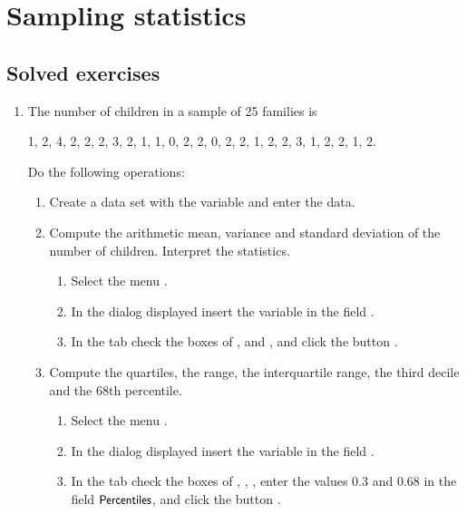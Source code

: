
\chapter{Sampling statistics}\label{cha:statistics}

\section{Solved exercises}
\begin{enumerate}[leftmargin=*]
\item The number of children in a sample of 25 families is
\begin{center}
1, 2, 4, 2, 2, 2, 3, 2, 1, 1, 0, 2, 2, 0, 2, 2, 1, 2, 2, 3, 1, 2, 2, 1, 2.
\end{center}
Do the following operations:
\begin{enumerate}
\item Create a data set with the variable  and enter the data.
\item Compute the arithmetic mean, variance and standard deviation of the number of children.
Interpret the statistics.
\begin{indication}
\begin{enumerate}
\item Select the menu .
\item In the dialog displayed insert the variable  in the field .
\item In the  tab check the boxes of ,  and
, and click the button .
\end{enumerate}
\end{indication}

\item Compute the quartiles, the range, the interquartile range, the third decile and the 68th percentile. 
\begin{indication}
\begin{enumerate}
\item Select the menu .
\item In the dialog displayed insert the variable  in the field .
\item In the  tab check the boxes of , , , enter the values $0.3$ and $0.68$ in the field $\textsf{\small Percentiles}$, and click the button .
\end{enumerate}
\end{indication}
\end{enumerate}


\end{enumerate}
